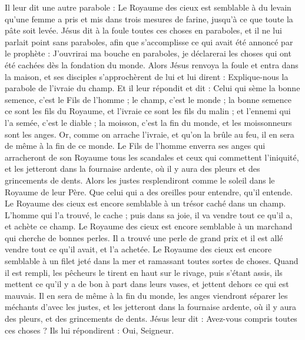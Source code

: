 \begin{multicols}{2}
Il leur dit une autre parabole : Le Royaume des cieux est semblable à du levain qu'une femme a pris et mis dans trois mesures de farine, jusqu'à ce que toute la pâte soit levée.
Jésus dit à la foule toutes ces choses en paraboles, et il ne lui parlait point sans paraboles,
afin que s'accomplisse ce qui avait été annoncé par le prophète : J'ouvrirai ma bouche en paraboles, je déclarerai les choses qui ont été cachées dès la fondation du monde.
Alors Jésus renvoya la foule et entra dans la maison, et ses disciples s'approchèrent de lui et lui dirent : Explique-nous la parabole de l'ivraie du champ.
Et il leur répondit et dit : Celui qui sème la bonne semence, c'est le Fils de l'homme ;
le champ, c'est le monde ; la bonne semence ce sont les fils du Royaume, et l'ivraie ce sont les fils du malin ;
et l'ennemi qui l'a semée, c'est le diable ; la moisson, c'est la fin du monde, et les moissonneurs sont les anges.
Or, comme on arrache l'ivraie, et qu'on la brûle au feu, il en sera de même à la fin de ce monde.
Le Fils de l'homme enverra ses anges qui arracheront de son Royaume tous les scandales et ceux qui commettent l'iniquité,
et les jetteront dans la fournaise ardente, où il y aura des pleurs et des grincements de dents.
Alors les justes resplendiront comme le soleil dans le Royaume de leur Père. Que celui qui a des oreilles pour entendre, qu'il entende.
Le Royaume des cieux est encore semblable à un trésor caché dans un champ. L'homme qui l'a trouvé, le cache ; puis dans sa joie, il va vendre tout ce qu'il a, et achète ce champ.
Le Royaume des cieux est encore semblable à un marchand qui cherche de bonnes perles.
Il a trouvé une perle de grand prix et il est allé vendre tout ce qu'il avait, et l'a achetée.
Le Royaume des cieux est encore semblable à un filet jeté dans la mer et ramassant toutes sortes de choses.
Quand il est rempli, les pêcheurs le tirent en haut sur le rivage, puis s'étant assis, ils mettent ce qu'il y a de bon à part dans leurs vases, et jettent dehors ce qui est mauvais.
Il en sera de même à la fin du monde, les anges viendront séparer les méchants d'avec les justes,
et les jetteront dans la fournaise ardente, où il y aura des pleurs, et des grincements de dents.
Jésus leur dit : Avez-vous compris toutes ces choses ? Ils lui répondirent : Oui, Seigneur.

\end{multicols}
